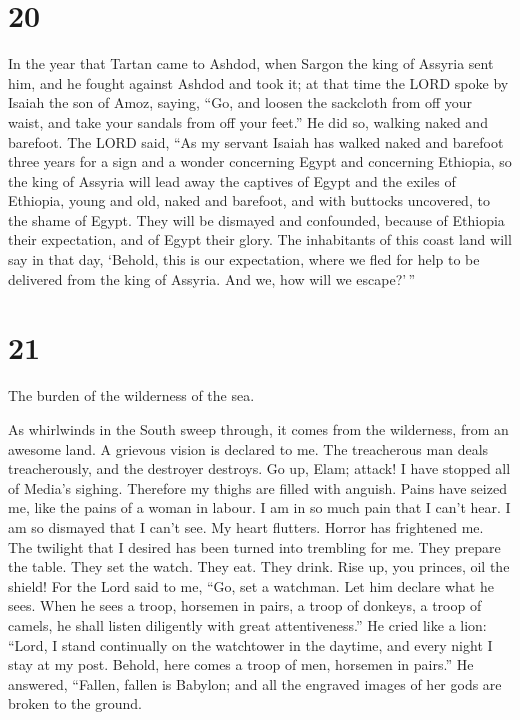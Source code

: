 \hypertarget{section-19}{%
\section{20}\label{section-19}}

 In the year that Tartan came to Ashdod, when Sargon the
king of Assyria sent him, and he fought against Ashdod and took it;
 at that time the LORD spoke by Isaiah the son of Amoz,
saying, ``Go, and loosen the sackcloth from off your waist, and take
your sandals from off your feet.'' He did so, walking naked and
barefoot.  The LORD said, ``As my servant Isaiah has
walked naked and barefoot three years for a sign and a wonder concerning
Egypt and concerning Ethiopia,  so the king of Assyria
will lead away the captives of Egypt and the exiles of Ethiopia, young
and old, naked and barefoot, and with buttocks uncovered, to the shame
of Egypt.  They will be dismayed and confounded, because
of Ethiopia their expectation, and of Egypt their glory. 
The inhabitants of this coast land will say in that day, `Behold, this
is our expectation, where we fled for help to be delivered from the king
of Assyria. And we, how will we escape?'\,''

\hypertarget{section-20}{%
\section{21}\label{section-20}}

 The burden of the wilderness of the sea.

As whirlwinds in the South sweep through, it comes from the wilderness,
from an awesome land.  A grievous vision is declared to
me. The treacherous man deals treacherously, and the destroyer destroys.
Go up, Elam; attack! I have stopped all of Media's sighing.
 Therefore my thighs are filled with anguish. Pains have
seized me, like the pains of a woman in labour. I am in so much pain
that I can't hear. I am so dismayed that I can't see.  My
heart flutters. Horror has frightened me. The twilight that I desired
has been turned into trembling for me.  They prepare the
table. They set the watch. They eat. They drink. Rise up, you princes,
oil the shield!  For the Lord said to me, ``Go, set a
watchman. Let him declare what he sees.  When he sees a
troop, horsemen in pairs, a troop of donkeys, a troop of camels, he
shall listen diligently with great attentiveness.''  He
cried like a lion: ``Lord, I stand continually on the watchtower in the
daytime, and every night I stay at my post.  Behold, here
comes a troop of men, horsemen in pairs.'' He answered, ``Fallen, fallen
is Babylon; and all the engraved images of her gods are broken to the
ground.


